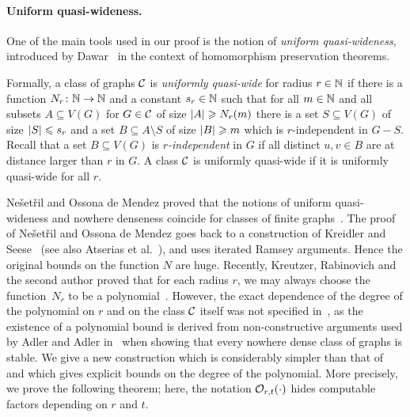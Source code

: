 \paragraph{Uniform quasi-wideness.}
One of the main tools used in our proof 
is the notion of \emph{uniform quasi-wideness},
introduced by Dawar~\cite{dawar2010homomorphism}
in the context of homomorphism preservation theorems.


Formally, a class of graphs $\mathcal{C}$  is \emph{uniformly quasi-wide} for radius $r\in \mathbb{N}$ %
if there is a function
 $N_r\colon \mathbb{N}\rightarrow \mathbb{N}$ and a constant  $s_r\in \mathbb{N}$ such
that for all $m\in \mathbb{N}$ and all subsets $A\subseteq V(G)$ for
$G\in \mathcal{C}$ of size $\left\lvert A\right\rvert\geqslant N_r(m)$ there is a set
$S\subseteq V(G)$ of size $\left\lvert S\right\rvert\leqslant s_r$ and a set
$B\subseteq A\setminus S$ of size $\left\lvert B\right\rvert\geqslant m$ which is $r$-independent in
$G-S$. Recall that a set $B\subseteq V(G)$ is  {\em{$r$-independent}} in $G$ if all
distinct $u,v\in B$ are at distance 
larger than $r$ in $G$.
A class $\mathcal{C}$ is uniformly quasi-wide  if it is uniformly quasi-wide for all $r$.

Ne\v{s}et\v{r}il and Ossona de Mendez proved that
the notions of uniform quasi-wideness and nowhere denseness coincide for 
classes of finite graphs~\cite{nevsetvril2011nowhere}. 
The proof of Ne\v{s}et\v{r}il 
and Ossona de Mendez goes back to a construction
of Kreidler and Seese~\cite{kreidler1998monadic} (see also Atserias et al.~\cite{atserias2006preservation}), 
and uses iterated Ramsey arguments. Hence the original bounds on 
the function $N$ are huge. Recently, Kreutzer, Rabinovich and the second author
 proved that for each radius $r$, we may always choose the function~$N_r$ to be a polynomial~\cite{siebertz2016polynomial}. However, the exact dependence of the degree of the polynomial on $r$ and on the class $\mathcal{C}$ itself
 was  not specified in~\cite{siebertz2016polynomial}, as the existence of a polynomial bound is derived
from non-constructive arguments used by Adler and Adler in~\cite{adler2014interpreting} when showing that every nowhere dense class of graphs
is stable. We give a new construction 
which is considerably simpler than that of~\cite{siebertz2016polynomial}
and which gives explicit bounds on the degree of the polynomial. 
More precisely, we prove the following theorem; here, the notation $\mathcal{O}_{r,t}(\cdot)$ hides computable factors depending on $r$ and $t$.

